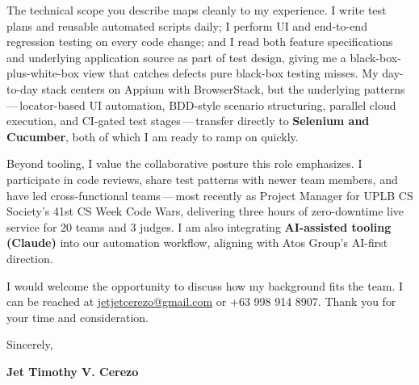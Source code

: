 \documentclass[11pt,a4paper]{article}
\begin{document}
\smallskip

The technical scope you describe maps cleanly to my experience. I write test plans and reusable automated scripts daily; I perform UI and end-to-end regression testing on every code change; and I read both feature specifications and underlying application source as part of test design, giving me a black-box-plus-white-box view that catches defects pure black-box testing misses. My day-to-day stack centers on Appium with BrowserStack, but the underlying patterns\,---\,locator-based UI automation, BDD-style scenario structuring, parallel cloud execution, and CI-gated test stages\,---\,transfer directly to \textbf{Selenium and Cucumber}, both of which I am ready to ramp on quickly.

\smallskip

Beyond tooling, I value the collaborative posture this role emphasizes. I participate in code reviews, share test patterns with newer team members, and have led cross-functional teams\,---\,most recently as Project Manager for UPLB CS Society's 41st CS Week Code Wars, delivering three hours of zero-downtime live service for 20 teams and 3 judges. I am also integrating \textbf{AI-assisted tooling (Claude)} into our automation workflow, aligning with Atos Group's AI-first direction.

\smallskip

I would welcome the opportunity to discuss how my background fits the team. I can be reached at \href{mailto:jetjetcerezo@gmail.com}{jetjetcerezo@gmail.com} or +63 998 914 8907. Thank you for your time and consideration.

\vspace{10pt}

\noindent Sincerely,

\vspace{14pt}

\noindent\textbf{Jet Timothy V. Cerezo}
\end{document}
